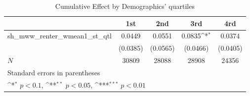 \begin{table}[htbp]\centering
\def\sym#1{\ifmmode^{#1}\else\(^{#1}\)\fi}
\caption{Cumulative Effect by Demographics' quartiles}
\begin{tabular}{l*{4}{c}}
\hline\hline
            &\multicolumn{1}{c}{1st}&\multicolumn{1}{c}{2nd}&\multicolumn{1}{c}{3rd}&\multicolumn{1}{c}{4rd}\\
\hline
sh\_mww\_renter\_wmean1\_st\_qtl&      0.0449         &      0.0551         &      0.0835\sym{*}  &      0.0374         \\
            &    (0.0385)         &    (0.0565)         &    (0.0466)         &    (0.0405)         \\
\hline
\(N\)       &       30809         &       28088         &       28908         &       24356         \\
\hline\hline
\multicolumn{5}{l}{\footnotesize Standard errors in parentheses}\\
\multicolumn{5}{l}{\footnotesize \sym{*} \(p<0.1\), \sym{**} \(p<0.05\), \sym{***} \(p<0.01\)}\\
\end{tabular}
\end{table}
